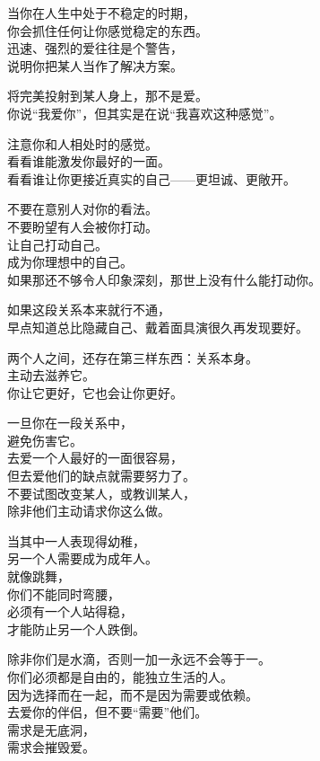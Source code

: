 \documentclass[
]{article}
\begin{document}
当你在人生中处于不稳定的时期，\\
你会抓住任何让你感觉稳定的东西。\\
迅速、强烈的爱往往是个警告，\\
说明你把某人当作了解决方案。

将完美投射到某人身上，那不是爱。\\
你说``我爱你''，但其实是在说``我喜欢这种感觉''。

注意你和人相处时的感觉。\\
看看谁能激发你最好的一面。\\
看看谁让你更接近真实的自己------更坦诚、更敞开。

不要在意别人对你的看法。\\
不要盼望有人会被你打动。\\
让自己打动自己。\\
成为你理想中的自己。\\
如果那还不够令人印象深刻，那世上没有什么能打动你。

如果这段关系本来就行不通，\\
早点知道总比隐藏自己、戴着面具演很久再发现要好。

两个人之间，还存在第三样东西：关系本身。\\
主动去滋养它。\\
你让它更好，它也会让你更好。

一旦你在一段关系中，\\
避免伤害它。\\
去爱一个人最好的一面很容易，\\
但去爱他们的缺点就需要努力了。\\
不要试图改变某人，或教训某人，\\
除非他们主动请求你这么做。

当其中一人表现得幼稚，\\
另一个人需要成为成年人。\\
就像跳舞，\\
你们不能同时弯腰，\\
必须有一个人站得稳，\\
才能防止另一个人跌倒。

除非你们是水滴，否则一加一永远不会等于一。\\
你们必须都是自由的，能独立生活的人。\\
因为选择而在一起，而不是因为需要或依赖。\\
去爱你的伴侣，但不要``需要''他们。\\
需求是无底洞，\\
需求会摧毁爱。
\end{document}
